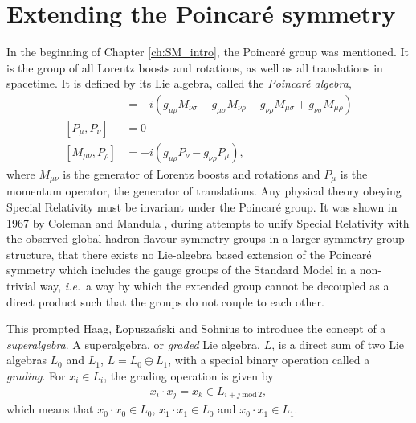 \documentclass[twoside,english]{uiofysmaster}
\begin{document}

\section{Extending the Poincar\'{e} symmetry}
In the beginning of Chapter \ref{ch:SM_intro}, the Poincar\'{e} group was mentioned. It is the group of all Lorentz boosts and rotations, as well as all translations in spacetime. It is defined by its Lie algebra, called the {\it Poincar\'{e} algebra},
\begin{align}
	[M_{\mu\nu}, M_{\rho\sigma}] &= -i(g_{\mu\rho}M_{\nu\sigma} - g_{\mu\sigma}M_{\nu\rho} - g_{\nu\rho}M_{\mu\sigma} + g_{\nu\sigma}M_{\mu\rho})\\
	[P_\mu, P_\nu] &= 0\\
	[M_{\mu\nu}, P_\rho] &= -i(g_{\mu\rho}P_\nu - g_{\nu\rho}P_\mu),
\end{align}
where $M_{\mu\nu}$ is the generator of Lorentz boosts and rotations and $P_\mu$ is the momentum operator, the generator of translations. Any physical theory obeying Special Relativity must be invariant under the Poincar\'{e} group. It was shown in 1967 by Coleman and Mandula \cite{PhysRev.159.1251}, during attempts to unify Special Relativity with the observed global hadron flavour symmetry groups in a larger symmetry group structure, that there exists no Lie-algebra based extension of the Poincar\'{e} symmetry which includes the gauge groups of the Standard Model in a non-trivial way, {\it i.e.}\ a way by which the extended group cannot be decoupled as a direct product such that the groups do not couple to each other.

This prompted Haag, \L{}opusza\'{n}ski and Sohnius \cite{Haag1975257} to introduce the concept of a {\it superalgebra}. A superalgebra, or {\it graded} Lie algebra, $L$, is a direct sum of two Lie algebras $L_0$ and $L_1$, $L = L_0 \oplus L_1$, with a special binary operation called a {\it grading}. For $x_i \in L_i$, the grading operation is given by
\begin{align}
	x_i \cdot x_j = x_k \in L_{i+j~\mathrm{mod}\,2},
\end{align}
which means that $x_0 \cdot x_0 \in L_0$, $x_1 \cdot x_1 \in L_0$ and $x_0 \cdot x_1 \in L_1$. 
\end{document}
